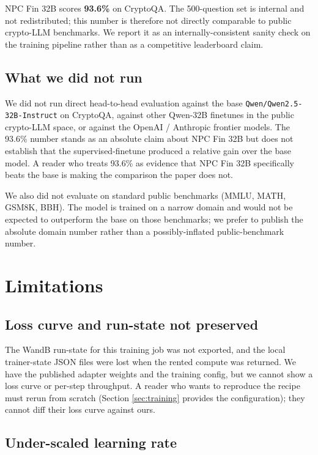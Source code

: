 \documentclass[10pt,letterpaper]{article}
\begin{document}
NPC Fin 32B scores \textbf{93.6\%} on CryptoQA. The 500-question set is internal and not redistributed; this number is therefore not directly comparable to public crypto-LLM benchmarks. We report it as an internally-consistent sanity check on the training pipeline rather than as a competitive leaderboard claim.

\subsection{What we did not run}

We did not run direct head-to-head evaluation against the base \texttt{Qwen/Qwen2.5-32B-Instruct} on CryptoQA, against other Qwen-32B finetunes in the public crypto-LLM space, or against the OpenAI / Anthropic frontier models. The 93.6\% number stands as an absolute claim about NPC Fin 32B but does not establish that the supervised-finetune produced a relative gain over the base model. A reader who treats 93.6\% as evidence that NPC Fin 32B specifically beats the base is making the comparison the paper does not.

We also did not evaluate on standard public benchmarks (MMLU, MATH, GSM8K, BBH). The model is trained on a narrow domain and would not be expected to outperform the base on those benchmarks; we prefer to publish the absolute domain number rather than a possibly-inflated public-benchmark number.

\section{Limitations}
\label{sec:limitations}

\subsection{Loss curve and run-state not preserved}

The WandB run-state for this training job was not exported, and the local trainer-state JSON files were lost when the rented compute was returned. We have the published adapter weights and the training config, but we cannot show a loss curve or per-step throughput. A reader who wants to reproduce the recipe must rerun from scratch (Section \ref{sec:training} provides the configuration); they cannot diff their loss curve against ours.

\subsection{Under-scaled learning rate}
\end{document}
